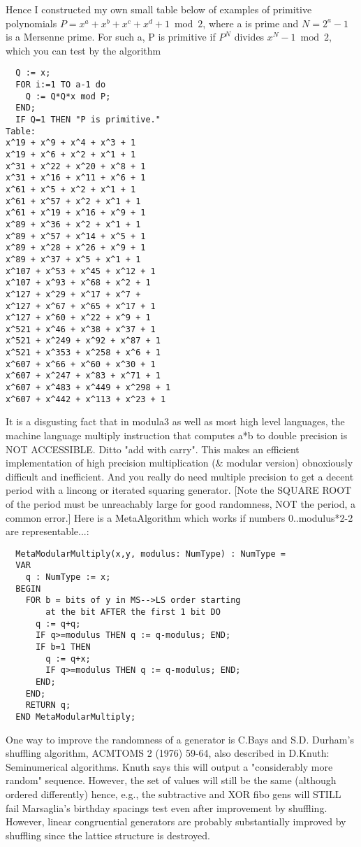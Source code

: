 Hence I constructed my own small table below of examples of primitive
polynomials $P=x^a+x^b+x^c+x^d+1 \bmod 2$, where a is prime and
$N=2^a - 1$
is a Mersenne prime. For such a, P is primitive if $P^N$
divides $x^N-1 \bmod 2$,
which you can test by the algorithm
\begin{verbatim}
  Q := x;
  FOR i:=1 TO a-1 do
    Q := Q*Q*x mod P;
  END;
  IF Q=1 THEN "P is primitive."
Table:
x^19 + x^9 + x^4 + x^3 + 1
x^19 + x^6 + x^2 + x^1 + 1
x^31 + x^22 + x^20 + x^8 + 1
x^31 + x^16 + x^11 + x^6 + 1 
x^61 + x^5 + x^2 + x^1 + 1 
x^61 + x^57 + x^2 + x^1 + 1 
x^61 + x^19 + x^16 + x^9 + 1
x^89 + x^36 + x^2 + x^1 + 1
x^89 + x^57 + x^14 + x^5 + 1
x^89 + x^28 + x^26 + x^9 + 1
x^89 + x^37 + x^5 + x^1 + 1
x^107 + x^53 + x^45 + x^12 + 1
x^107 + x^93 + x^68 + x^2 + 1
x^127 + x^29 + x^17 + x^7 + 
x^127 + x^67 + x^65 + x^17 + 1
x^127 + x^60 + x^22 + x^9 + 1
x^521 + x^46 + x^38 + x^37 + 1
x^521 + x^249 + x^92 + x^87 + 1
x^521 + x^353 + x^258 + x^6 + 1 
x^607 + x^66 + x^60 + x^30 + 1 
x^607 + x^247 + x^83 + x^71 + 1
x^607 + x^483 + x^449 + x^298 + 1 
x^607 + x^442 + x^113 + x^23 + 1 
\end{verbatim}

It is a disgusting fact that in modula3 as well as most high level languages,
the machine language multiply instruction that computes a*b to double
precision is NOT ACCESSIBLE. Ditto "add with carry". This makes an
efficient implementation of high precision multiplication (\& modular
version) obnoxiously difficult and inefficient. And you really
do need multiple precision to get a decent period with a lincong
or iterated squaring generator.
[Note the SQUARE ROOT of the period must be unreachably large for
good randomness, NOT the period, a common error.]
Here is a MetaAlgorithm which works
if numbers 0..modulus*2-2 are representable...:
\begin{verbatim}
  MetaModularMultiply(x,y, modulus: NumType) : NumType =
  VAR
    q : NumType := x;
  BEGIN
    FOR b = bits of y in MS-->LS order starting
        at the bit AFTER the first 1 bit DO
      q := q+q;
      IF q>=modulus THEN q := q-modulus; END;
      IF b=1 THEN
        q := q+x;
        IF q>=modulus THEN q := q-modulus; END;
      END;
    END;
    RETURN q;
  END MetaModularMultiply;
\end{verbatim}

One way to improve the randomness of a generator is
C.Bays and S.D. Durham's shuffling algorithm, ACMTOMS 2 (1976)
59-64, also described in D.Knuth: Seminumerical algorithms.
Knuth says this will output a "considerably more random" sequence.
However, the set of values will still be the same (although ordered
differently) hence, e.g., the subtractive and XOR fibo gens will
STILL fail Marsaglia's birthday spacings test even after improvement
by shuffling. However, linear congruential generators are probably
substantially improved by shuffling since the lattice structure is
destroyed.

